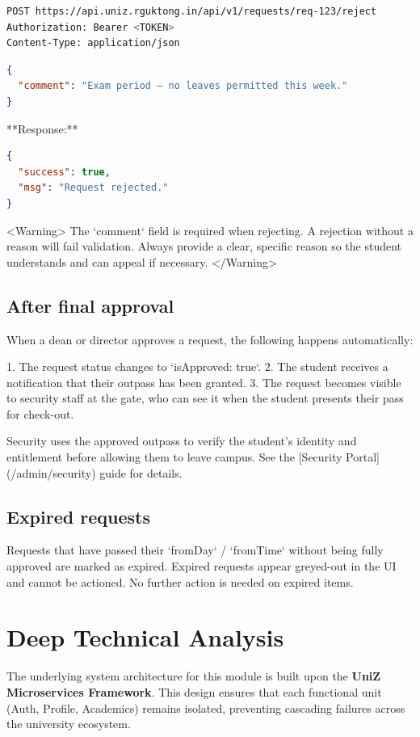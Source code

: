 \begin{lstlisting}[language=bash]
POST https://api.uniz.rguktong.in/api/v1/requests/req-123/reject
Authorization: Bearer <TOKEN>
Content-Type: application/json

\end{lstlisting}

\begin{lstlisting}[language=json]
{
  "comment": "Exam period — no leaves permitted this week."
}

\end{lstlisting}

**Response:**

\begin{lstlisting}[language=json]
{
  "success": true,
  "msg": "Request rejected."
}

\end{lstlisting}

<Warning>
  The `comment` field is required when rejecting. A rejection without a reason
  will fail validation. Always provide a clear, specific reason so the student
  understands and can appeal if necessary.
</Warning>

\subsection{After final approval}

When a dean or director approves a request, the following happens automatically:

1. The request status changes to `isApproved: true`.
2. The student receives a notification that their outpass has been granted.
3. The request becomes visible to security staff at the gate, who can see it when the student presents their pass for check-out.

Security uses the approved outpass to verify the student's identity and entitlement before allowing them to leave campus. See the [Security Portal](/admin/security) guide for details.

\subsection{Expired requests}

Requests that have passed their `fromDay` / `fromTime` without being fully approved are marked as expired. Expired requests appear greyed-out in the UI and cannot be actioned. No further action is needed on expired items.


\section{Deep Technical Analysis}
The underlying system architecture for this module is built upon the \textbf{UniZ Microservices Framework}. 
This design ensures that each functional unit (Auth, Profile, Academics) remains isolated, preventing cascading failures across the university ecosystem.


